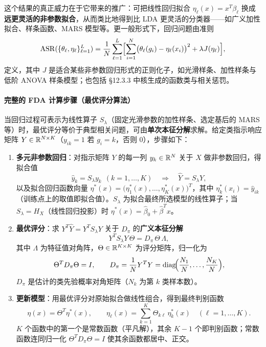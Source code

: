 \begin{remark}[推广的威力]
这个结果的真正威力在于它带来的推广：可把线性回归拟合 $\eta_\ell(x)=x^T\beta_\ell$ 换成\textbf{远更灵活的非参数拟合}，从而类比地得到比 LDA 更灵活的分类器——如广义加性拟合、样条函数、MARS 模型等。更一般形式下，回归问题由准则
\begin{equation}
\mathrm{ASR}(\{\theta_\ell,\eta_\ell\}_{\ell=1}^{L}) = \frac{1}{N}\sum_{\ell=1}^{L}\Bigl[\sum_{i=1}^{N}\bigl(\theta_\ell(g_i) - \eta_\ell(x_i)\bigr)^2 + \lambda J(\eta_\ell)\Bigr], \label{eq:12_56}
\end{equation}
定义，其中 $J$ 是适合某些非参数回归形式的正则化子，如光滑样条、加性样条与低阶 ANOVA 样条模型；也包括 §12.3.3 中核生成的函数类与相关惩罚。
\end{remark}

\paragraph{完整的 FDA 计算步骤（最优评分算法）}

当回归过程可表示为线性算子 $S_\lambda$（固定光滑参数的加性样条、选定基后的 MARS 等）时，最优评分等价于典型相关问题，可由\textbf{单次本征分解}求解。给定类指示响应矩阵 $Y\in\mathbb{R}^{N\times K}$（$y_{ik}=1$ 若 $g_i=k$，否则 0），步骤如下：

\begin{enumerate}
\item \textbf{多元非参数回归}：对指示矩阵 $Y$ 的每一列 $y_k\in\mathbb{R}^N$ 关于 $X$ 做非参数回归，得拟合值
\[
\hat y_k = S_\lambda y_k\ \ (k=1,\dots,K) \quad\Longrightarrow\quad \hat Y = S_\lambda Y,
\]
以及拟合回归函数向量 $\eta^*(x)=\bigl(\eta_1^*(x),\dots,\eta_K^*(x)\bigr)^T$，其中 $\eta_k^*(x_i)=\hat y_{ik}$（训练点上的取值即拟合值）。$S_\lambda$ 为拟合最终所选模型的线性算子；当 $S_\lambda=H_X$（线性回归投影）时 $\eta^*(x)=\hat\beta_0+\hat\beta^T x$。

\item \textbf{最优评分}：求 $Y^T\hat Y = Y^T S_\lambda Y$ 关于 $D_\pi$ 的\textbf{广义本征分解}
\[
Y^T S_\lambda Y\,\Theta = D_\pi\,\Theta\,\Lambda,
\]
其中 $\Lambda$ 为特征值对角阵，$\Theta\in\mathbb{R}^{K\times K}$ 为评分矩阵，归一化为
\[
\Theta^T D_\pi \Theta = I, \qquad D_\pi = \frac{1}{N}Y^T Y = \operatorname{diag}\!\Bigl(\frac{N_1}{N},\dots,\frac{N_K}{N}\Bigr),
\]
$D_\pi$ 是估计的类先验概率对角矩阵（$N_k$ 为第 $k$ 类样本数）。

\item \textbf{更新模型}：用最优评分对原始拟合做线性组合，得到最终判别函数
\[
\eta(x) = \Theta^T \eta^*(x), \qquad \eta_\ell(x) = \sum_{k=1}^{K}\Theta_{k\ell}\,\eta_k^*(x)\quad(\ell=1,\dots,K).
\]
$K$ 个函数中的第一个是常数函数（平凡解），其余 $K-1$ 个即判别函数；常数函数连同归一化 $\Theta^T D_\pi\Theta=I$ 使其余函数都居中、正交。
\end{enumerate}

